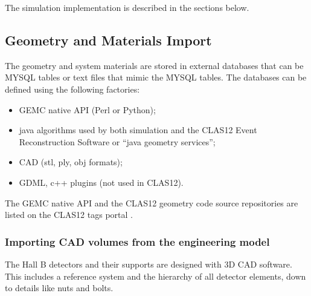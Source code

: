 The simulation implementation is described in the sections below.

\subsection{Geometry and Materials Import}

The geometry and system materials are stored in external databases that can be MYSQL tables or text files that mimic the MYSQL tables.
The databases can be defined using the following factories:

\begin{itemize}
	\item GEMC native API (Perl or Python);
	\item java algorithms used by both simulation and the CLAS12 Event Reconstruction Software \cite{recon-nim} or ``java geometry services'';
	\item CAD (stl, ply, obj formats);
	\item GDML, c++ plugins (not used in CLAS12).
\end{itemize}

The GEMC native API and the CLAS12 geometry code source repositories are listed on the CLAS12 tags portal \cite{clas12tags}.


\subsubsection{Importing CAD volumes from the engineering model}

The Hall B detectors and their supports are designed with 3D CAD software. This includes a reference system and the
hierarchy of all detector elements, down to details like nuts and bolts.

